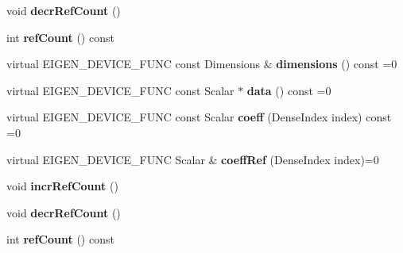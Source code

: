 \begin{DoxyCompactItemize}
\item 
\mbox{\label{class_eigen_1_1internal_1_1_tensor_lazy_base_evaluator_a02e7748ec5354ccd033cff68847916ba}} 
void {\bfseries decr\+Ref\+Count} ()
\item 
\mbox{\label{class_eigen_1_1internal_1_1_tensor_lazy_base_evaluator_a013688194c3d997101e418dc6c57b577}} 
int {\bfseries ref\+Count} () const
\item 
\mbox{\label{class_eigen_1_1internal_1_1_tensor_lazy_base_evaluator_a79a186979ef9cbac21f920ba11f4bd17}} 
virtual E\+I\+G\+E\+N\+\_\+\+D\+E\+V\+I\+C\+E\+\_\+\+F\+U\+NC const Dimensions \& {\bfseries dimensions} () const =0
\item 
\mbox{\label{class_eigen_1_1internal_1_1_tensor_lazy_base_evaluator_aefdf12bef4c491de42ba4b43fcf49cfd}} 
virtual E\+I\+G\+E\+N\+\_\+\+D\+E\+V\+I\+C\+E\+\_\+\+F\+U\+NC const Scalar $\ast$ {\bfseries data} () const =0
\item 
\mbox{\label{class_eigen_1_1internal_1_1_tensor_lazy_base_evaluator_a6bccdf2ae168f8eba0f3a18ff1b0c8e2}} 
virtual E\+I\+G\+E\+N\+\_\+\+D\+E\+V\+I\+C\+E\+\_\+\+F\+U\+NC const Scalar {\bfseries coeff} (Dense\+Index index) const =0
\item 
\mbox{\label{class_eigen_1_1internal_1_1_tensor_lazy_base_evaluator_ad03a2eb2419ff9ddae9be04d0228c4d6}} 
virtual E\+I\+G\+E\+N\+\_\+\+D\+E\+V\+I\+C\+E\+\_\+\+F\+U\+NC Scalar \& {\bfseries coeff\+Ref} (Dense\+Index index)=0
\item 
\mbox{\label{class_eigen_1_1internal_1_1_tensor_lazy_base_evaluator_aa61ea5c3d4f5e5fc3a9442527423fe61}} 
void {\bfseries incr\+Ref\+Count} ()
\item 
\mbox{\label{class_eigen_1_1internal_1_1_tensor_lazy_base_evaluator_a02e7748ec5354ccd033cff68847916ba}} 
void {\bfseries decr\+Ref\+Count} ()
\item 
\mbox{\label{class_eigen_1_1internal_1_1_tensor_lazy_base_evaluator_a013688194c3d997101e418dc6c57b577}} 
int {\bfseries ref\+Count} () const
\end{DoxyCompactItemize}


